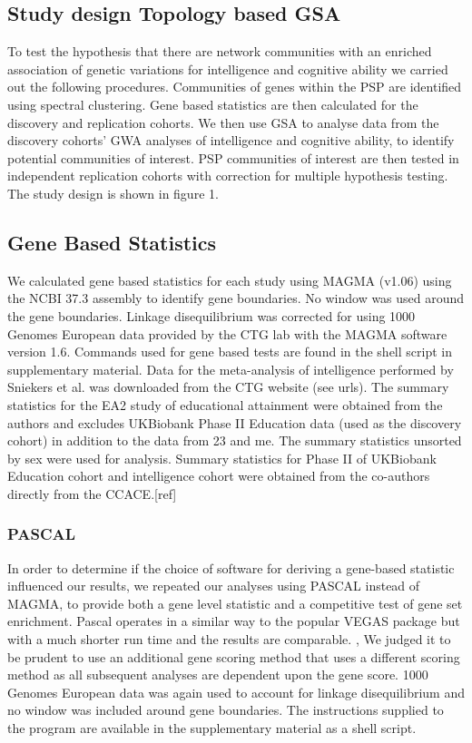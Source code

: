 \subsection{Study design Topology based GSA}
To test the hypothesis that there are network communities with an enriched association of genetic variations for intelligence and cognitive ability we carried out the following procedures.
Communities of genes within the PSP are identified using spectral clustering. Gene based statistics are then calculated for the discovery and replication cohorts. We then use GSA to analyse data from the discovery cohorts’ GWA analyses of intelligence and cognitive ability, to identify potential communities of interest. PSP communities of interest are then tested in independent replication cohorts with correction for multiple hypothesis testing. The study design is shown in figure 1.

\subsection{Gene Based Statistics}
We calculated gene based statistics for each study using MAGMA (v1.06) using the NCBI 37.3 assembly to identify gene boundaries. \cite{de2015magma}   No window was used around the gene boundaries. Linkage disequilibrium was corrected for using 1000 Genomes European data provided by the CTG lab with the MAGMA software version 1.6.\cite{de2015magma}  Commands used for gene based tests are found in the shell script in supplementary material. Data for the meta-analysis of intelligence performed by Sniekers  et al. was downloaded from the CTG website (see urls). \cite{sniekers2017genome}  The summary statistics for the EA2 study of educational attainment were obtained from the authors and excludes UKBiobank Phase II Education data (used as the discovery cohort) in addition to the data from 23 and me. \cite{okbay2016genome}  The summary statistics unsorted by sex were used for analysis. Summary statistics for Phase II of UKBiobank Education cohort and intelligence cohort were obtained from the co-authors directly from the CCACE.[ref]

\subsubsection{PASCAL}
\label{sec:PASCAL community detection}
In order to determine if the choice of software for deriving a gene-based statistic influenced our results, we repeated our analyses using PASCAL instead of MAGMA, to provide both a gene level statistic and a competitive test of gene set enrichment. \cite{lamparter2016fast}  Pascal operates in a similar way to the popular VEGAS package but with a much shorter run time and the results are comparable. \cite{lamparter2016fast},\cite{liu2010versatile}  We judged it to be prudent to use an additional gene scoring method that uses a different scoring method as all subsequent analyses are dependent upon the gene score. 1000 Genomes European data was again used to account for linkage disequilibrium and no window was included around gene boundaries. The instructions supplied to the program are available in the supplementary material as a shell script. 


